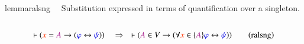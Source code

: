 \begin{restatable}{lemma}{ralsng}~~ Substitution expressed in terms of
quantification over a singleton.
       ~  ~  ~
\begin{align}
\vdash ( \msc{x} = \mc{A} \rightarrow ( \mw{\varphi} \leftrightarrow \mw{\psi}
    ) )\quad\Rightarrow\quad \vdash ( \mc{A} \in V \rightarrow ( \forall
    \msc{x} \in \{ \mc{A} \} \mw{\varphi} \leftrightarrow \mw{\psi} )
    )\label{eq:ralsng}\tag{ralsng}
\end{align}
\end{restatable}

\opeqonetwo

\oteqonetwothreed

\dfiun

\dfiin


